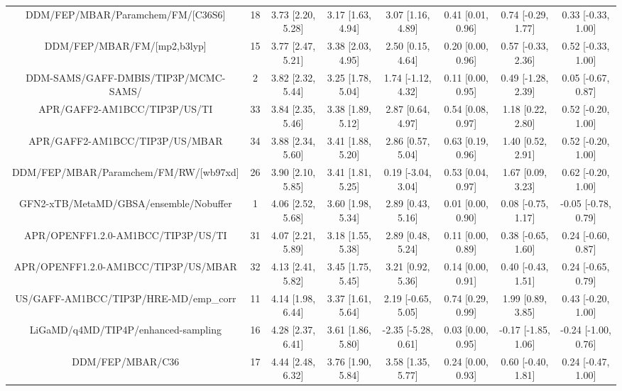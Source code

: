 \documentclass[8pt]{article}
\begin{document}
\begin{center}
\begin{footnotesize}
\begin{longtable}{|cccccccc|}
        DDM/FEP/MBAR/Paramchem/FM/[C36S6] &  18 &   3.73 [2.20, 5.28] &   3.17 [1.63, 4.94] &     3.07 [1.16, 4.89] &  0.41 [0.01, 0.96] &   0.74 [-0.29, 1.77] &   0.33 [-0.33, 1.00] \\
              DDM/FEP/MBAR/FM/[mp2,b3lyp] &  15 &   3.77 [2.47, 5.21] &   3.38 [2.03, 4.95] &     2.50 [0.15, 4.64] &  0.20 [0.00, 0.96] &   0.57 [-0.33, 2.36] &   0.52 [-0.33, 1.00] \\
     DDM-SAMS/GAFF-DMBIS/TIP3P/MCMC-SAMS/ &   2 &   3.82 [2.32, 5.44] &   3.25 [1.78, 5.04] &    1.74 [-1.12, 4.32] &  0.11 [0.00, 0.95] &   0.49 [-1.28, 2.39] &   0.05 [-0.67, 0.87] \\
             APR/GAFF2-AM1BCC/TIP3P/US/TI &  33 &   3.84 [2.35, 5.46] &   3.38 [1.89, 5.12] &     2.87 [0.64, 4.97] &  0.54 [0.08, 0.97] &    1.18 [0.22, 2.80] &   0.52 [-0.20, 1.00] \\
           APR/GAFF2-AM1BCC/TIP3P/US/MBAR &  34 &   3.88 [2.34, 5.60] &   3.41 [1.88, 5.20] &     2.86 [0.57, 5.04] &  0.63 [0.19, 0.96] &    1.40 [0.52, 2.91] &   0.52 [-0.20, 1.00] \\
    DDM/FEP/MBAR/Paramchem/FM/RW/[wb97xd] &  26 &   3.90 [2.10, 5.85] &   3.41 [1.81, 5.25] &    0.19 [-3.04, 3.04] &  0.53 [0.04, 0.97] &    1.67 [0.09, 3.23] &   0.62 [-0.20, 1.00] \\
   GFN2-xTB/MetaMD/GBSA/ensemble/Nobuffer &   1 &   4.06 [2.52, 5.68] &   3.60 [1.98, 5.34] &     2.89 [0.43, 5.16] &  0.01 [0.00, 0.90] &   0.08 [-0.75, 1.17] &  -0.05 [-0.78, 0.79] \\
       APR/OPENFF1.2.0-AM1BCC/TIP3P/US/TI &  31 &   4.07 [2.21, 5.89] &   3.18 [1.55, 5.38] &     2.89 [0.48, 5.24] &  0.11 [0.00, 0.89] &   0.38 [-0.65, 1.60] &   0.24 [-0.60, 0.87] \\
     APR/OPENFF1.2.0-AM1BCC/TIP3P/US/MBAR &  32 &   4.13 [2.41, 5.82] &   3.45 [1.75, 5.45] &     3.21 [0.92, 5.36] &  0.14 [0.00, 0.91] &   0.40 [-0.43, 1.51] &   0.24 [-0.65, 0.79] \\
    US/GAFF-AM1BCC/TIP3P/HRE-MD/emp\_corr &  11 &   4.14 [1.98, 6.44] &   3.37 [1.61, 5.64] &    2.19 [-0.65, 5.05] &  0.74 [0.29, 0.99] &    1.99 [0.89, 3.85] &   0.43 [-0.20, 1.00] \\
      LiGaMD/q4MD/TIP4P/enhanced-sampling &  16 &   4.28 [2.37, 6.41] &   3.61 [1.86, 5.80] &   -2.35 [-5.28, 0.61] &  0.03 [0.00, 0.95] &  -0.17 [-1.85, 1.06] &  -0.24 [-1.00, 0.76] \\
                         DDM/FEP/MBAR/C36 &  17 &   4.44 [2.48, 6.32] &   3.76 [1.90, 5.84] &     3.58 [1.35, 5.77] &  0.24 [0.00, 0.93] &   0.60 [-0.40, 1.81] &   0.24 [-0.47, 1.00] \\

\end{longtable}
\end{footnotesize}
\end{center}
\end{document}
